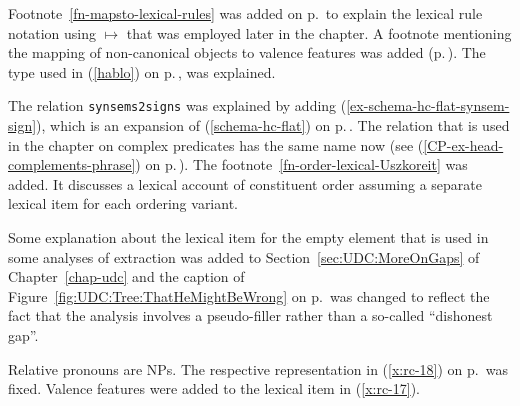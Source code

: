 %


Footnote~\ref{fn-mapsto-lexical-rules} was added on p.\,\pageref{fn-mapsto-lexical-rules} to explain
the lexical rule notation using $\mapsto$ that was employed later in the chapter. A footnote
mentioning the mapping of non-canonical objects to valence features was added (p.\,\pageref{fn-non-cannonical-arg-st}). 
The type  used in (\ref{hablo}) on p.\,\pageref{hablo}, was explained.

The relation \texttt{synsems2signs} was explained by adding (\ref{ex-schema-hc-flat-synsem-sign}),
which is an expansion of (\ref{schema-hc-flat}) on p.\,\pageref{schema-hc-flat}. The relation that
is used in the chapter on complex predicates has the same name now (see
(\ref{CP-ex-head-complements-phrase}) on p.\,\pageref{CP-ex-head-complements-phrase}). The
footnote~\ref{fn-order-lexical-Uszkoreit} was added. It discusses a lexical account of constituent
order assuming a separate lexical item for each ordering variant.







Some explanation about the lexical item for the empty element that is used in some analyses of
extraction was added to Section~\ref{sec:UDC:MoreOnGaps} of Chapter~\ref{chap-udc} and the 
caption of Figure~\ref{fig:UDC:Tree:ThatHeMightBeWrong} on
p.\,\pageref{fig:UDC:Tree:ThatHeMightBeWrong} was changed to reflect the fact that the analysis
involves a pseudo-filler rather than a so-called ``dishonest gap''.




Relative pronouns are NPs. The respective representation in (\ref{x:rc-18}) on p.\,\pageref{x:rc-18}
was fixed. Valence features were added to the lexical item in (\ref{x:rc-17}).

